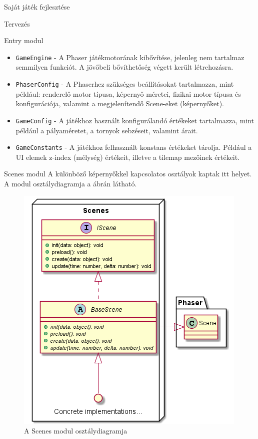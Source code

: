 \begin{MyChapter}{Saját játék fejlesztése}
\begin{MySection}{Tervezés}
\begin{MySubSection}{Entry modul}
\begin{itemize}
				\item \texttt{GameEngine} - A Phaser játékmotorának kibővítése, jelenleg nem tartalmaz semmilyen funkciót. A jövőbeli bővíthetőség végett került létrehozásra.
				
				\item \texttt{PhaserConfig} - A Phaserhez szükséges beállításokat tartalmazza, mint például: renderelő motor típusa, képernyő méretei, fizikai motor típusa és konfigurációja, valamint a megjelenítendő Scene-eket (képernyőket).
				
				\item \texttt{GameConfig} - A játékhoz használt konfigurálandó értékeket tartalmazza, mint például a pályaméretet, a tornyok sebzéseit, valamint árait.
				
				\item \texttt{GameConstants} - A játékhoz felhasznált konstans értékeket tárolja. Például a UI elemek z-index (mélység) értékeit, illetve a tilemap mezőinek értékeit.
			\end{itemize}
		\end{MySubSection}
	
		\begin{MySubSection}{Scenes modul}
			A különböző képernyőkkel kapcsolatos osztályok kaptak itt helyet.
			A modul osztálydiagramja a  ábrán látható.
			
			\begin{figure}[h!]
				\centering
				\includegraphics[scale=0.82]{kepek/uml/scenes/scene-pt1.png}
				\caption{A Scenes modul osztálydiagramja}
				\label{fig:uml:scene}
			\end{figure}
			

\end{MySubSection}
\end{MySection}
\end{MyChapter}
